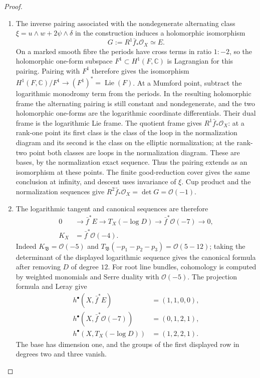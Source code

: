 \begin{proof}
\begin{enumerate}[label=\arabic*.,leftmargin=*]
\item The inverse pairing associated with the nondegenerate alternating
class $\xi=u\wedge w+2\psi\wedge\delta$ in the construction induces a
holomorphic isomorphism
\[
 G:=R^1\bar f_*\mathcal O_X\simeq E.
\]
On a marked smooth fibre the periods
have cross terms in ratio $1:-2$, so the holomorphic one-form
subspace $F^1\subset H^1(F,\mathbb C)$ is Lagrangian for this pairing.
Pairing with $F^1$ therefore gives the isomorphism
$H^1(F,\mathbb C)/F^1\to(F^1)^*=\operatorname{Lie}(F)$.
At a Mumford point, subtract the logarithmic monodromy term from the
periods. In the resulting holomorphic frame the alternating pairing
is still constant and nondegenerate, and the two holomorphic
one-forms are the logarithmic coordinate differentials. Their dual
frame is the logarithmic Lie frame. The quotient frame gives
$R^1\bar f_*\mathcal O_X$: at a rank-one point its first class is
the class of the loop in the normalization diagram and its second
is the class on the elliptic normalization; at the rank-two point
both classes are loops in the normalization diagram. These are
bases, by the normalization exact sequence. Thus the pairing extends
as an isomorphism at these points. The finite good-reduction cover
gives the same conclusion at infinity, and descent uses invariance
of $\xi$. Cup product and the normalization sequences
give $R^2\bar f_*\mathcal O_X=\det G=\mathcal O(-1)$.

\item The logarithmic tangent and canonical sequences are therefore
\[
\begin{split}
 0&\longrightarrow\bar f^*E\longrightarrow T_X(-\log D)
 \longrightarrow\bar f^*\mathcal O(-7)\longrightarrow0,\\
 K_X&=\bar f^*\mathcal O(-4).
\end{split}
\]
Indeed $K_{\mathfrak B}=\mathcal O(-5)$ and
$T_{\mathfrak B}(-p_1-p_2-p_3)=\mathcal O(5-12)$; taking the
determinant of the displayed logarithmic sequence gives the
canonical formula after removing $D$ of degree $12$.
For root line bundles, cohomology is computed by weighted monomials
and Serre duality with $\mathcal O(-5)$. The projection formula and
Leray give
\[
\begin{split}
 h^\bullet(X,\bar f^*E)&=(1,1,0,0),\\
 h^\bullet(X,\bar f^*\mathcal O(-7))&=(0,1,2,1),\\
 h^\bullet(X,T_X(-\log D))&=(1,2,2,1).
\end{split}
\]
The base has dimension one, and the groups of the first displayed
row in degrees two and three vanish.


\end{enumerate}
\end{proof}

